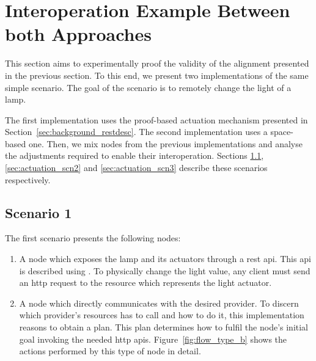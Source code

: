 \section{Interoperation Example Between both Approaches}
\label{sec:actuation_interoperation}

This section aims to experimentally proof the validity of the alignment presented in the previous section.
To this end, we present two implementations of the same simple scenario.
The goal of the scenario is to remotely change the light of a lamp.

The first implementation uses the proof-based actuation mechanism presented in Section~\ref{sec:background_restdesc}.
The second implementation uses a space-based one.
Then, we mix nodes from the previous implementations and analyse the adjustments required to enable their interoperation.
Sections \ref{sec:actuation_scn1}, \ref{sec:actuation_scn2} and \ref{sec:actuation_scn3} describe these scenarios respectively.



\newcommand{\nodea}{\emph{A} node}
\newcommand{\nodeb}{\emph{B} node}
\newcommand{\nodec}{\emph{C} node}
\newcommand{\noded}{\emph{D} node}



\subsection{Scenario 1}
\label{sec:actuation_scn1}


The first scenario presents the following nodes:
\begin{enumerate}[label=\itshape(\alph*\upshape)]
  \item A node which exposes the lamp and its actuators through a \ac{rest} \ac{api}.
	This \ac{api} is described using \restdesc{}. %
	To physically change the light value, any client must send an \acs{http} request to the resource which represents the light actuator.
	
  \item A node which directly communicates with the desired provider.
	To discern which provider's resources has to call and how to do it, this implementation reasons to obtain a plan.
	This plan determines how to fulfil the node's initial goal invoking the needed \ac{http} \acsp{api}.
	Figure~\ref{fig:flow_type_b} shows the actions performed by this type of node in detail.
\end{enumerate}



